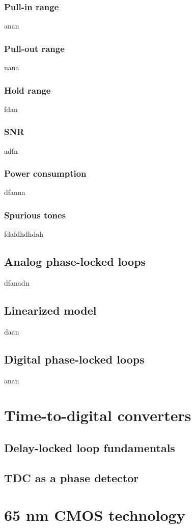 \subsubsection{Pull-in range}
anan
\subsubsection{Pull-out range}
nana
\subsubsection{Hold range}
fdan
\subsubsection{SNR}
adfn
\subsubsection{Power consumption}
dfanna
\subsubsection{Spurious tones}
fdafdhdhdah

\subsection{Analog phase-locked loops}
dfanadn
\subsection{Linearized model}
daan
\subsection{Digital phase-locked loops}
anan
\section{Time-to-digital converters}
\subsection{Delay-locked loop fundamentals}
\subsection{TDC as a phase detector}

\section{65 nm CMOS technology}
